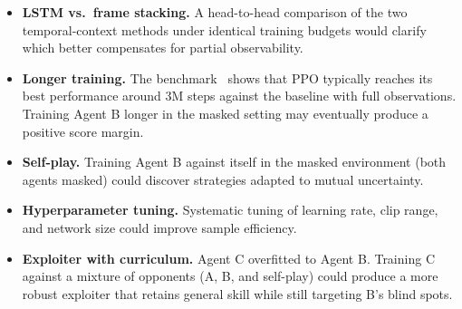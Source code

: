 \documentclass[conference]{IEEEtran}
\begin{document}
\begin{itemize}
    \item \textbf{LSTM vs.\ frame stacking.} A head-to-head comparison of the two temporal-context methods under identical training budgets would clarify which better compensates for partial observability.
    \item \textbf{Longer training.} The benchmark~\cite{slimevolleygym} shows that PPO typically reaches its best performance around 3M steps against the baseline with full observations. Training Agent B longer in the masked setting may eventually produce a positive score margin.
    \item \textbf{Self-play.} Training Agent B against itself in the masked environment (both agents masked) could discover strategies adapted to mutual uncertainty.
    \item \textbf{Hyperparameter tuning.} Systematic tuning of learning rate, clip range, and network size could improve sample efficiency.
    \item \textbf{Exploiter with curriculum.} Agent C overfitted to Agent B. Training C against a mixture of opponents (A, B, and self-play) could produce a more robust exploiter that retains general skill while still targeting B's blind spots.
\end{itemize}




\end{document}

